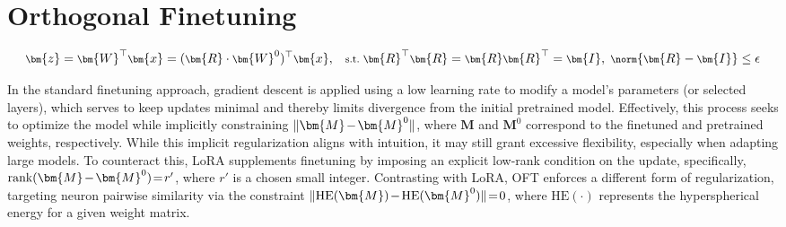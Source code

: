 \section{Orthogonal Finetuning}

\begin{equation}\label{eq:coft_general}
    \footnotesize
    \bm{z}=\bm{W}^\top\bm{x}=(\bm{R}\cdot\bm{W}^0)^\top\bm{x},~~~\text{s.t.}~\bm{R}^\top\bm{R}=\bm{R}\bm{R}^\top=\bm{I},~\norm{\bm{R}-\bm{I}}\leq \epsilon
\end{equation}

In the standard finetuning approach, gradient descent is applied using a low learning rate to modify a model's parameters (or selected layers), which serves to keep updates minimal and thereby limits divergence from the initial pretrained model. Effectively, this process seeks to optimize the model while implicitly constraining $\thickmuskip=2mu \medmuskip=2mu \| \bm{M} - \bm{M}^0\|$, where $\bm{M}$ and $\bm{M}^0$ correspond to the finetuned and pretrained weights, respectively. While this implicit regularization aligns with intuition, it may still grant excessive flexibility, especially when adapting large models. To counteract this, LoRA supplements finetuning by imposing an explicit low-rank condition on the update, specifically, $\thickmuskip=2mu \medmuskip=2mu \text{rank}(\bm{M} - \bm{M}^0)=r'$, where $r'$ is a chosen small integer. Contrasting with LoRA, OFT enforces a different form of regularization, targeting neuron pairwise similarity via the constraint $\thickmuskip=2mu \medmuskip=2mu \| \text{HE}(\bm{M})-\text{HE}(\bm{M}^0) \|=0$, where $\text{HE}(\cdot)$ represents the hyperspherical energy for a given weight matrix. 


\begin{abstract}
Large-scale text-to-image diffusion models have demonstrated remarkable proficiency in synthesizing photorealistic images from textual descriptions. An outstanding open question remains: how can these potent models be systematically guided or controlled to fulfill diverse downstream objectives? To this end, we present Orthogonal Finetuning~(OFT), a principled approach for finetuning text-to-image diffusion models toward various downstream tasks. In contrast to prior techniques, OFT rigorously maintains the hyperspherical energy, which encodes the pairwise interactions between neurons mapped onto the unit hypersphere. Our investigations suggest that this preservation is vital to maintaining the semantic generative capabilities inherent in text-to-image diffusion models. To bolster the stability of the finetuning procedure, we introduce an enhanced variant, Constrained Orthogonal Finetuning (COFT), which applies an additional constraint on the hypersphere’s radius. Our focus centers on two significant finetuning scenarios: subject-driven generation, aiming to create subject-specific images from a limited set of example images and a corresponding text prompt; and controllable generation, where the model incorporates supplementary control inputs. Experimental evidence shows that the OFT methodology achieves superior generation fidelity and accelerates convergence relative to existing approaches.
\end{abstract}


